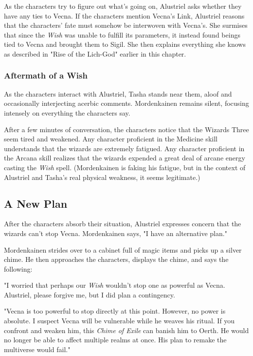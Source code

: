 \documentclass[10pt,a4paper,twoside,bg=print,twocolumn,openany,nodeprecatedcode]{dndbook}
\begin{document}
As the characters try to figure out what's going on, Alustriel asks whether they have any ties to Vecna. If the characters mention Vecna's Link, Alustriel reasons that the characters' fate must somehow be interwoven with Vecna's. She surmises that since the \textit{Wish} was unable to fulfill its parameters, it instead found beings tied to Vecna and brought them to Sigil. She then explains everything she knows as described in "Rise of the Lich-God" earlier in this chapter.

\subsubsection{Aftermath of a Wish}
As the characters interact with Alustriel, Tasha stands near them, aloof and occasionally interjecting acerbic comments. Mordenkainen remains silent, focusing intensely on everything the characters say.

After a few minutes of conversation, the characters notice that the Wizards Three seem tired and weakened. Any character proficient in the Medicine skill understands that the wizards are extremely fatigued. Any character proficient in the Arcana skill realizes that the wizards expended a great deal of arcane energy casting the \textit{Wish} spell. (Mordenkainen is faking his fatigue, but in the context of Alustriel and Tasha's real physical weakness, it seems legitimate.)

\subsection{A New Plan}
After the characters absorb their situation, Alustriel expresses concern that the wizards can't stop Vecna. Mordenkainen says, "I have an alternative plan."

Mordenkainen strides over to a cabinet full of magic items and picks up a silver chime. He then approaches the characters, displays the chime, and says the following:

\begin{DndReadAloud}{}
"I worried that perhaps our \textit{Wish} wouldn't stop one as powerful as Vecna. Alustriel, please forgive me, but I did plan a contingency.

"Vecna is too powerful to stop directly at this point. However, no power is absolute. I suspect Vecna will be vulnerable while he weaves his ritual. If you confront and weaken him, this \textit{Chime of Exile} can banish him to Oerth. He would no longer be able to affect multiple realms at once. His plan to remake the multiverse would fail."

\end{DndReadAloud}
\end{document}
